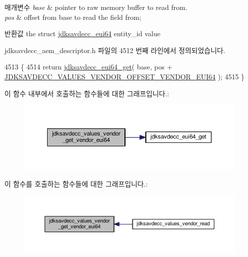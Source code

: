 \begin{DoxyParams}{매개변수}
{\em base} & pointer to raw memory buffer to read from. \\
\hline
{\em pos} & offset from base to read the field from; \\
\hline
\end{DoxyParams}
\begin{DoxyReturn}{반환값}
the struct \hyperlink{structjdksavdecc__eui64}{jdksavdecc\+\_\+eui64} entity\+\_\+id value 
\end{DoxyReturn}


jdksavdecc\+\_\+aem\+\_\+descriptor.\+h 파일의 4512 번째 라인에서 정의되었습니다.


\begin{DoxyCode}
4513 \{
4514     \textcolor{keywordflow}{return} \hyperlink{group__eui64_ga2652311a25a6b91cddbed75c108c7031}{jdksavdecc\_eui64\_get}( base, pos + 
      \hyperlink{group__values__vendor_ga408d2f5fb73860bae8662b67faf86303}{JDKSAVDECC\_VALUES\_VENDOR\_OFFSET\_VENDOR\_EUI64} );
4515 \}
\end{DoxyCode}


이 함수 내부에서 호출하는 함수들에 대한 그래프입니다.\+:
\nopagebreak
\begin{figure}[H]
\begin{center}
\leavevmode
\includegraphics[width=350pt]{group__values__vendor_ga7cbde0c8a9c382e4783b5d4c7059958c_cgraph}
\end{center}
\end{figure}




이 함수를 호출하는 함수들에 대한 그래프입니다.\+:
\nopagebreak
\begin{figure}[H]
\begin{center}
\leavevmode
\includegraphics[width=350pt]{group__values__vendor_ga7cbde0c8a9c382e4783b5d4c7059958c_icgraph}
\end{center}
\end{figure}


